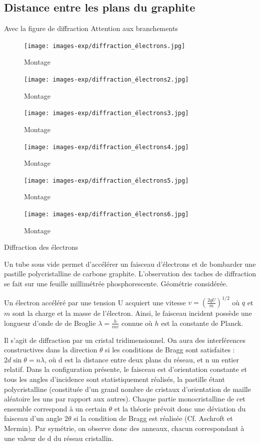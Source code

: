 \documentclass{article}%
\begin{document}
\subsection{Distance entre les plans du graphite}
Avec la figure de diffraction
Attention aux branchements
\begin{figure}
	\centerline{\texttt{[image: images-exp/diffraction\_électrons.jpg]}}
	\caption{Montage}
\end{figure}
\begin{figure}
	\centerline{\texttt{[image: images-exp/diffraction\_électrons2.jpg]}}
	\caption{Montage}
\end{figure}
\begin{figure}
	\centerline{\texttt{[image: images-exp/diffraction\_électrons3.jpg]}}
	\caption{Montage}
\end{figure}
\begin{figure}
	\centerline{\texttt{[image: images-exp/diffraction\_électrons4.jpg]}}
	\caption{Montage}
\end{figure}
\begin{figure}
	\centerline{\texttt{[image: images-exp/diffraction\_électrons5.jpg]}}
	\caption{Montage}
\end{figure}
\begin{figure}
	\centerline{\texttt{[image: images-exp/diffraction\_électrons6.jpg]}}
	\caption{Montage}
\end{figure}

Diffraction des électrons

Un tube sous vide permet d'accélérer un faisceau d'électrons et de bombarder une pastille polycristalline de carbone graphite. L'observation des taches de diffraction se fait sur une feuille millimétrée phosphorescente.
Géométrie considérée.

Un électron accéléré par une tension U acquiert une vitesse $v=\left(\frac{2qU}{m}\right)^{1/2}$ où $q$ et $m$ sont la charge et la masse de l'électron. Ainsi, le faisceau incident possède une longueur d'onde de de Broglie $\lambda=\frac{h}{mv}$ connue où $h$ est la constante de Planck.

Il s'agit de diffraction par un cristal tridimensionnel. On aura des interférences constructives dans la direction $\theta$ si les conditions de Bragg sont satisfaites : $2d \sin \theta = n \lambda$, où d est la distance entre deux plans du réseau, et n un entier relatif. Dans la configuration présente, le faisceau est d'orientation constante et tous les angles d'incidence sont statistiquement réalisés, la pastille étant polycristalline (constituée d'un grand nombre de cristaux d'orientation de maille aléatoire les uns par rapport aux autres). Chaque partie monocristalline de cet ensemble correspond à un certain $\theta$ et la théorie prévoit donc une déviation du faisceau d'un angle $2\theta$ si la condition de Bragg est réalisée (Cf. Aschroft et Mermin). Par symétrie, on observe donc des anneaux, chacun correspondant à une valeur de d du réseau cristallin.
\end{document}
